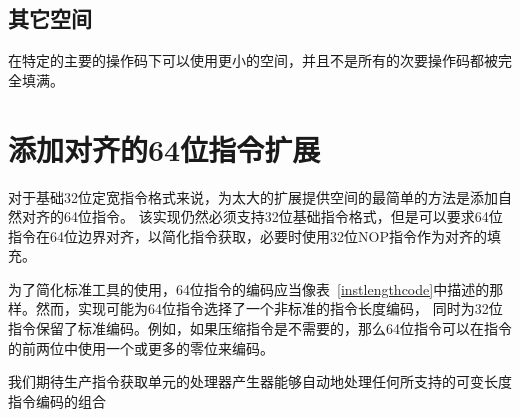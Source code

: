 \subsection*{其它空间}

在特定的主要的操作码下可以使用更小的空间，并且不是所有的次要操作码都被完全填满。

\section{添加对齐的64位指令扩展}

对于基础32位定宽指令格式来说，为太大的扩展提供空间的最简单的方法是添加自然对齐的64位指令。
该实现仍然必须支持32位基础指令格式，但是可以要求64位指令在64位边界对齐，以简化指令获取，必要时使用32位NOP指令作为对齐的填充。

为了简化标准工具的使用，64位指令的编码应当像表~\ref{instlengthcode}中描述的那样。然而，实现可能为64位指令选择了一个非标准的指令长度编码，
同时为32位指令保留了标准编码。例如，如果压缩指令是不需要的，那么64位指令可以在指令的前两位中使用一个或更多的零位来编码。

\begin{commentary}
  我们期待生产指令获取单元的处理器产生器能够自动地处理任何所支持的可变长度指令编码的组合
\end{commentary}


